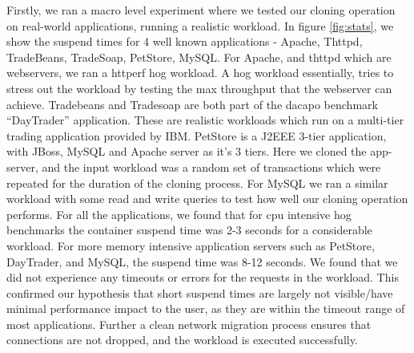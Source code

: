 Firstly, we ran a macro level experiment where we tested our cloning operation on real-world applications, running a realistic workload.
In figure \ref{fig:stats}, we show the suspend times for 4 well known applications - Apache, Thttpd, TradeBeans, TradeSoap, PetStore, MySQL. 
For Apache, and thttpd which are webservers, we ran a httperf hog workload. A hog workload essentially, tries to stress out the workload by testing the max throughput that the webserver can achieve.
Tradebeans and Tradesoap are both part of the dacapo \cite{dacapo} benchmark ``DayTrader'' application.
These are realistic workloads which run on a multi-tier trading application provided by IBM. 
PetStore is a J2EEE 3-tier application, with JBoss, MySQL and Apache server as it's 3 tiers.
Here we cloned the app-server, and the input workload was a random set of transactions which were repeated for the duration of the cloning process.
For MySQL we ran a similar workload with some read and write queries to test how well our cloning operation performs.
For all the applications, we found that for cpu intensive hog benchmarks the container suspend time was 2-3 seconds for a considerable workload.
For more memory intensive application servers such as PetStore, DayTrader, and MySQL, the suspend time was 8-12 seconds.
We found that we did not experience any timeouts or errors for the requests in the workload. 
This confirmed our hypothesis that short suspend times are largely not visible/have minimal performance impact to the user, as they are within the timeout range of most applications.
Further a clean network migration process ensures that connections are not dropped, and the workload is executed successfully.

